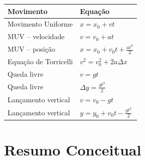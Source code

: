 \documentclass[a4paper,12pt]{article}
\begin{document}
\begin{center}

\renewcommand{\arraystretch}{1.6}

\begin{tabular}{|
>{\centering\arraybackslash}m{5cm}|
>{\centering\arraybackslash}m{8cm}|
}

\hline

\textbf{Movimento} &
\textbf{Equação}
\\

\hline

Movimento Uniforme &
\(x=x_0+vt\)
\\

\hline

MUV -- velocidade &
\(v=v_0+at\)
\\

\hline

MUV -- posição &
\(x=x_0+v_0t+\frac{at^2}{2}\)
\\

\hline

Equação de Torricelli &
\(v^2=v_0^2+2a\Delta x\)
\\

\hline

Queda livre &
\(v=gt\)
\\

\hline

Queda livre &
\(\Delta y=\frac{gt^2}{2}\)
\\

\hline

Lançamento vertical &
\(v=v_0-gt\)
\\

\hline

Lançamento vertical &
\(y=y_0+v_0t-\frac{gt^2}{2}\)
\\

\hline

\end{tabular}

\end{center}


\section{Resumo Conceitual}
\end{document}
